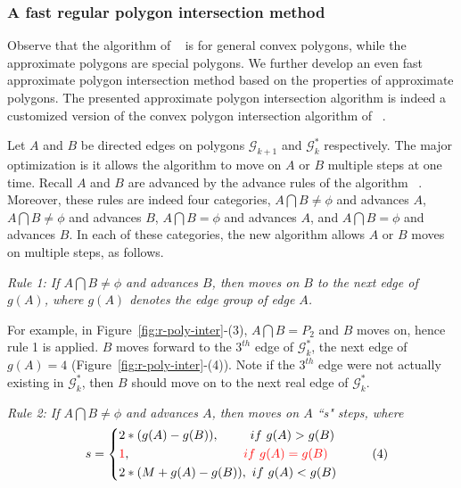 
\subsubsection{A fast regular polygon intersection method}


Observe that the algorithm of ~\cite{ORourke:Intersection} is for general convex polygons, while the approximate polygons are special polygons. We further develop an even fast approximate polygon intersection method based on the properties of approximate polygons.
%
The presented approximate polygon intersection algorithm is indeed a customized version of the convex polygon intersection algorithm of ~\cite{ORourke:Intersection}. 

Let $A$ and $B$ be directed edges on polygons $\mathcal{G}_{k+1}$ and $\mathcal{G}^*_k$ respectively. The major optimization is it allows the algorithm to move on $A$ or $B$ multiple steps at one time.
Recall $A$ and $B$ are advanced by the advance rules of the algorithm ~\cite{ORourke:Intersection}.
Moreover, these rules are indeed four categories, \ie $A \bigcap B \ne \phi$ and advances $A$, $A \bigcap B \ne \phi$ and advances $B$, $A \bigcap B = \phi$ and advances $A$, and $A \bigcap B = \phi$ and advances $B$.
%
In each of these categories, the new algorithm allows $A$ or $B$ moves on multiple steps, as follows.



\sstab \emph{Rule 1: 
If $A \bigcap B \ne \phi$ and advances $B$, then moves on $B$ to the next edge of $g(A)$, where $g(A)$ denotes the edge group of edge $A$.}


For example, in Figure~\ref{fig:r-poly-inter}-(3), $A \bigcap B = P_2$ and $B$ moves on, hence rule 1 is applied. $B$ moves forward to the $3^{th}$ edge of $\mathcal{G}^*_k$, \ie the next edge of $g(A) = 4$ (Figure~\ref{fig:r-poly-inter}-(4)).
Note if the $3^{th}$ edge were not actually existing in $\mathcal{G}^*_k$, then $B$ should move on to the next real edge of $\mathcal{G}^*_k$.


\sstab \emph{Rule 2: 
If $A \bigcap B \ne \phi$ and advances $A$, then moves on $A$ ``s" steps, where}
\vspace{-1ex}
\begin{equation*}
\small
\label{equ-rule1}
    \hspace{2ex} s =  \left\{
    \begin{aligned}
        & 2*(g(A) - g(B)),  \hspace{5ex} ~if  ~g(A) > g(B) \\
        & \textcolor[rgb]{1.00,0.00,0.00}{1}, \hspace{21ex}\textcolor[rgb]{1.00,0.00,0.00}{if  ~g(A) = g(B)} \\
        & 2*(M+g(A) - g(B)), ~if  ~g(A) < g(B) \\
    \end{aligned}
    \right.       \hspace{6ex}(4)
\end{equation*}
\vspace{-1ex}


